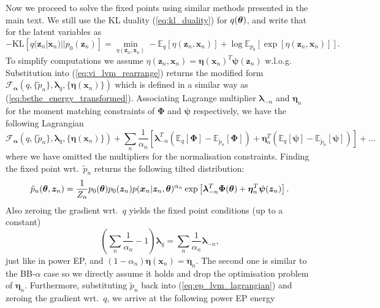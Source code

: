 Now we proceed to solve the fixed points using similar methods presented in the main text. We still use the KL duality (\ref{eq:kl_duality}) for $q(\bm{\theta})$, and write that for the latent variables as
\begin{equation}
 -\mathrm{KL}[q(\bm{z}_n|\bm{x}_n)||p_0(\bm{z}_n)] = \min_{\eta(\bm{z}_n, \bm{x}_n)} - \mathbb{E}_q[\eta(\bm{z}_n, \bm{x}_n)] + \log \mathbb{E}_{p_0} \left[ \exp [\eta(\bm{z}_n, \bm{x}_n)] \right].
\end{equation}
To simplify computations we assume $\eta(\bm{z}_n, \bm{x}_n) = \bm{\eta}(\bm{x}_n)^T \bm{\psi}(\bm{z}_n)$ w.l.o.g. Substitution into (\ref{eq:vi_lvm_rearrange}) returns the modified form $\mathcal{F}_{\bm{\alpha}}(q, \{ \tilde{p}_n \}, \bm{\lambda}_q, \{ \bm{\eta}(\bm{x}_n) \} )$ which is defined in a similar way as (\ref{eq:bethe_energy_transformed}). Associating Lagrange multiplier $\bm{\lambda}_{-n}$ and $\bm{\eta}_{n}$ for the moment matching constraints of $\bm{\Phi}$ and $\bm{\psi}$ respectively, we have the following Lagrangian
\begin{equation}
\mathcal{F}_{\bm{\alpha}}(q, \{ \tilde{p}_n \}, \bm{\lambda}_q, \{ \bm{\eta}(\bm{x}_n) \} ) + \sum_n \frac{1}{\alpha_n} \left[ \bm{\lambda}_{-n}^{T}(\mathbb{E}_{q}[\bm{\Phi}] - \mathbb{E}_{\tilde{p}_n}[\bm{\Phi}]) + \bm{\eta}_n^{T}( \mathbb{E}_{q}[\bm{\psi}] - \mathbb{E}_{\tilde{p}_n}[\bm{\psi}]) \right] + ... 
\label{eq:ep_lvm_lagrangian}
\end{equation}
where we have omitted the multipliers for the normalisation constraints. Finding the fixed point wrt.~$\tilde{p}_n$ returns the following tilted distribution:
\begin{equation}
\tilde{p}_n(\bm{\theta}, \bm{z}_n) = \frac{1}{Z_n} p_0(\bm{\theta}) p_0(\bm{z}_n) p( \bm{x}_n | \bm{z}_n, \bm{\theta})^{\alpha_n} \exp \left[ \bm{\lambda}_{-n}^T \bm{\Phi}(\bm{\theta}) + \bm{\eta}_n^T \bm{\psi}(\bm{z}_n) \right].
\end{equation}
Also zeroing the gradient wrt.~$q$ yields the fixed point conditions (up to a constant) 
$$\left( \sum_n \frac{1}{\alpha_n} - 1 \right) \bm{\lambda}_q = \sum_n \frac{1}{\alpha_n} \bm{\lambda}_{-n},$$
just like in power EP, and $(1 - \alpha_n) \bm{\eta}(\bm{x}_n) = \bm{\eta}_n$. The second one is similar to the BB-$\alpha$ case so we directly assume it holds and drop the optimisation problem of $\bm{\eta}_n$. Furthermore, substituting $\tilde{p}_n$ back into (\ref{eq:ep_lvm_lagrangian}) and zeroing the gradient wrt.~$q$, we arrive at the following power EP energy
